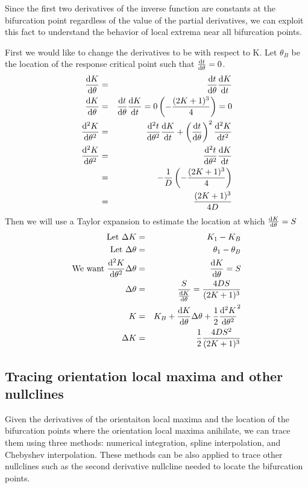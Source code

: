 \documentclass[11pt]{article} %
\begin{document}
Since the first two derivatives of the inverse function are constants at the bifurcation point regardless of the value of the partial derivatives, we can exploit this fact to understand the behavior of local extrema near all bifurcation points.

First we would like to change the derivatives to be with respect to K. Let $ \theta_B $ be the location of the response critical point such that $ \dv{t}{\theta} (\theta_B) = 0 $.
\begin{eqnarray}
\dv{K}{\theta} & = & \dv{t}{\theta} \dv{K}{t} \\
\dv{K}{\theta} (\theta_B) & = & \dv{t}{\theta} (\theta_B) \dv{K}{t} = 0 \left( -\frac{(2K+1)^3}{4} \right) = 0 \\
\dv[2]{K}{\theta} & = & \dv[2]{t}{\theta} \dv{K}{t} + \left( \dv{t}{\theta} \right)^2 \dv[2]{K}{t}  \\
\dv[2]{K}{\theta} (\theta_B) & = & \dv[2]{t}{\theta} (\theta_B) \dv{K}{t} \\
    & = & -\frac{1}{D} \left( -\frac{(2K+1)^3}{4} \right) \\
    & = & \frac{(2K+1)^3}{4D} \\
\end{eqnarray}
Then we will use a Taylor expansion to estimate the location at which $ \dv{K}{\theta} = S $
\begin{eqnarray}
\mbox{Let } \Delta K & = & K_1 - K_B \\
\mbox{Let } \Delta \theta & = & \theta_1 - \theta_B \\
\mbox{We want } \dv[2]{K}{\theta}  \Delta \theta & = & \dv{K}{\theta} = S \\
\Delta \theta & = & \frac{S}{\dv{K}{\theta} } = \frac{4DS}{(2K+1)^3}\\
K & = & K_B  +\dv{K}{\theta} \Delta \theta + \frac{1}{2} \dv[2]{K}{\theta} (\Delta \theta)^2 \\
\Delta K & = & \frac{1}{2}  \frac{4DS^2}{(2K+1)^3}
\end{eqnarray}


\subsection{Tracing orientation local maxima and other nullclines}

Given the derivatives of the orientaiton local maxima and the location of the bifurcation points where the orientation local maxima anihilate, we can trace them using three methods: numerical integration, spline interpolation, and Chebyshev interpolation. These methods can be also applied to trace other nullclines such as the second derivative nullcline needed to locate the bifurcation points.
\end{document}
